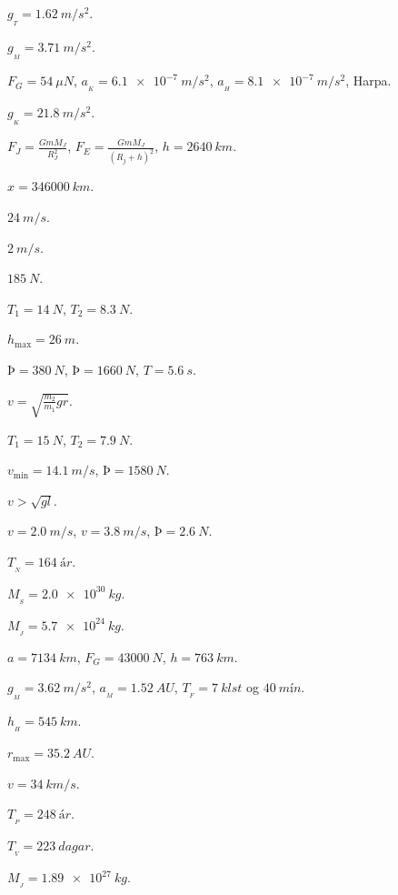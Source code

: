 \ifdefined \wholebook \else\documentclass[oneside]{book}\usepackage{EdlBook}\graphicspath{{figures/}}
\begin{document}
\begin{enumerate*}[label = \vspace{0.15cm} \textbf{(\arabic*)}]
  \item $g_{_T} = \SI{1.62}{m/s^2}$.
  \item $g_{_M} = \SI{3.71}{m/s^2}$.
  \item $F_G = \SI{54}{\mu N}$, $a_{_K} = \SI{6.1e-7}{m/s^2}$, $a_{_H} = \SI{8.1e-7}{m/s^2}$, Harpa.
  \item $g_{_K} = \SI{21.8}{m/s^2}$.
  \item $F_J = \frac{GmM_J}{R_J^2}$, $F_E = \frac{Gm M_J}{(R_j + h)^2}$,  $h = \SI{2640}{km}$.
  \item $x = \SI{346000}{km}$.
  \item $\SI{24}{m/s}$.
  \item $\SI{2}{m/s}$.
  \item $\SI{185}{N}$.
  \item $T_1 = \SI{14}{N}$, $T_2 = \SI{8.3}{N}$.
  \item $h_{\text{max}} = \SI{26}{m}$.
  \item $Þ = \SI{380}{N}$, $Þ = \SI{1660}{N}$, $T= \SI{5.6}{s}$.
  \item $v = \sqrt{\frac{m_2}{m_1}gr}$.
  \item $T_1 = \SI{15}{N}$, $T_2 = \SI{7.9}{N}$.
  \item $v_{\text{min}} = \SI{14.1}{m/s}$, $Þ = \SI{1580}{N}$.
  \item $v > \sqrt{gl}$.
  \item $v = \SI{2.0}{m/s}$, $v = \SI{3.8}{m/s}$, $Þ = \SI{2.6}{N}$.
  \item $T_{_N} = \SI{164}{ár}$.
  \item $M_{_S} = \SI{2.0e30}{kg}$.
  \item $M_{_J} = \SI{5.7e24}{kg}$.
  \item $a = \SI{7134}{km}$, $F_G = \SI{43000}{N}$, $h = \SI{763}{km}$.
  \item $g_{_M} = \SI{3.62}{m/s^2}$, $a_{_M} = \SI{1.52}{AU}$, $T_{_F} = \SI{7}{klst}$ og $\SI{40}{mín}$.
  \item $h_{_H} = \SI{545}{km}$.
  \item $r_{\text{max}} = \SI{35.2}{AU}$.
  \item $v = \SI{34}{km/s}$.
  \item $T_{_P} = \SI{248}{ár}$.
  \item $T_{_V} = \SI{223}{dagar}$.
  \item $M_{_J} = \SI{1.89e27}{kg}$.
\end{enumerate*}


\ifdefined \wholebook \else
 \printindex
\end{document}

